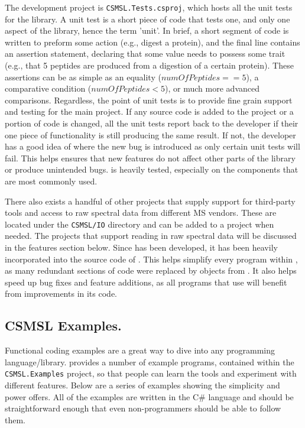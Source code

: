 The development project is \texttt{CSMSL.Tests.csproj}, which hosts all the unit tests for the library. A unit test is a short piece of code that tests one, and only one aspect of the library, hence the term 'unit'. In brief, a short segment of code is written to preform some action (e.g., digest a protein), and the final line contains an assertion statement, declaring that some value needs to possess some trait (e.g., that 5 peptides are produced from a digestion of a certain protein). These assertions can be as simple as an equality ($numOfPeptides == 5$), a comparative condition ($numOfPeptides < 5$), or much more advanced comparisons. Regardless, the point of unit tests is to provide fine grain support and testing for the main project. If any source code is added to the project or a portion of code is changed, all the unit tests report back to the developer if their one piece of functionality is still producing the same result. If not, the developer has a good idea of where the new bug is introduced as only certain unit tests will fail. This helps ensures that new features do not affect other parts of the library or produce unintended bugs. \csmsl{} is heavily tested, especially on the components that are most commonly used.

There also exists a handful of other projects that supply support for third-party tools and access to raw spectral data from different MS vendors. These are located under the \texttt{CSMSL/IO} directory and can be added to a project when needed. The projects that support reading in raw spectral data will be discussed in the features section below. Since \csmsl{} has been developed, it has been heavily incorporated into the source code of \compass{}. This helps simplify every program within \compass{}, as many redundant sections of code were replaced by objects from \csmsl{}. It also helps speed up bug fixes and feature additions, as all programs that use \csmsl{} will benefit from improvements in its code.

\subsection*{CSMSL Examples.}
Functional coding examples are a great way to dive into any programming language/library. \csmsl{} provides a number of example programs, contained within the \texttt{CSMSL.Examples} project, so that people can learn the tools and experiment with different features. Below are a series of examples showing the simplicity and power \csmsl{} offers. All of the examples are written in the C\# language and should be straightforward enough that even non-programmers should be able to follow them.

